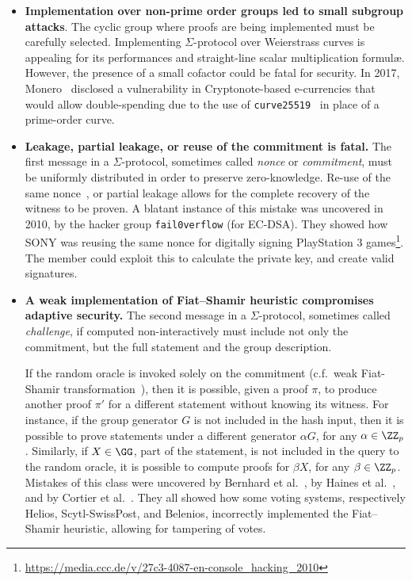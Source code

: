 \documentclass[runningheads]{llncs}
\begin{document}
\begin{itemize}
  \item \textbf{Implementation over non-prime order groups led to small subgroup attacks}. The cyclic group where proofs are being implemented must be carefully selected. Implementing $\Sigma$-protocol over Weierstrass curves is appealing for its performances and straight-line scalar multiplication formul\ae.
   However, the presence of a small cofactor could be fatal for security.
In 2017, Monero~\cite{monero-fail} disclosed a vulnerability in Cryptonote-based e-currencies that would allow double-spending
due to the use of \verb|curve25519|~\cite{PKC:Bernstein06} in place of a prime-order curve.
  \item \textbf{Leakage, partial leakage, or reuse of the commitment is fatal.}
  The first message in a  $\Sigma$-protocol, sometimes called \emph{nonce} or \emph{commitment}, must be uniformly distributed in order to preserve zero-knowledge. Re-use of the same nonce~\cite{CCS:ANTTY20}, or partial leakage allows for the complete recovery of the witness to be proven.
  A blatant instance of this mistake was uncovered in 2010, by the hacker group \texttt{fail0verflow} (for EC-DSA). They showed how SONY was reusing the same nonce for digitally signing PlayStation 3 games\footnote{\url{https://media.ccc.de/v/27c3-4087-en-console_hacking_2010}}.  The member could exploit this to calculate the private key, and create valid signatures.

  \item \textbf{A weak implementation of Fiat--Shamir heuristic compromises adaptive security.} The second message in a  $\Sigma$-protocol, sometimes called \emph{challenge}, if computed non-interactively must include not only the commitment, but the full statement and the group description.

  If the random oracle is invoked solely on the commitment (c.f.\ weak Fiat-Shamir transformation~\cite[Def.\ 2]{AC:BerPerWar12}), then it is possible, given a proof $\pi$, to produce another proof $\pi'$ for a different statement without knowing its witness.
  For instance, if the group generator $G$ is not included in the hash input, then it is possible to prove statements under a different generator $\alpha G$, for any $\alpha \in \ZZ_p$.
  Similarly, if $X \in \GG$, part of the statement, is not included in the query to the random oracle, it is possible to compute proofs for $\beta X$, for any $\beta \in \ZZ_p$.
  Mistakes of this class were uncovered by Bernhard et al.~\cite{AC:BerPerWar12}, by Haines et al.~\cite{SP:HLPT20}, and by Cortier et al.~\cite{cortier2020}.
  They all showed how some voting systems, respectively Helios,  Scytl-SwissPost, and Belenios, incorrectly
  implemented the Fiat--Shamir heuristic, allowing for tampering of votes.

\end{itemize}
\end{document}
